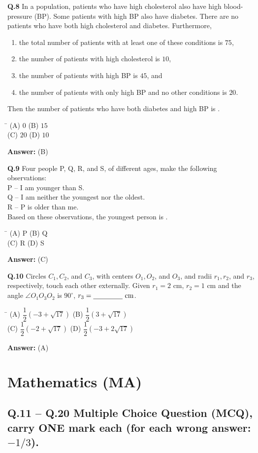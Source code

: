 \documentclass[11pt,a4paper]{article}
\newcommand{\optsfourA}[4]{%
  \begin{tabbing}
    \hspace{0.48\linewidth}\=\kill
    (A) #1 \> (B) #2 \\[2pt]
    (C) #3 \> (D) #4
  \end{tabbing}%
}
\newcommand{\ans}[1]{\textbf{Answer:} #1\par\medskip}
\begin{document}
\textbf{Q.8} In a population, patients who have high cholesterol also have high blood-pressure (BP). Some patients with high BP also have diabetes. There are no patients who have both high cholesterol and diabetes. Furthermore,
\begin{enumerate}
  \setlength{\itemsep}{1pt}\setlength{\parskip}{0pt}
  \item the total number of patients with at least one of these conditions is $75$,
  \item the number of patients with high cholesterol is $10$,
  \item the number of patients with high BP is $45$, and
  \item the number of patients with only high BP and no other conditions is $20$.
\end{enumerate}
Then the number of patients who have both diabetes and high BP is \underline{\hspace{2cm}}.
\optsfourA{$0$}{$15$}{$20$}{$10$}
\ans{(B)}

\textbf{Q.9} Four people P, Q, R, and S, of different ages, make the following observations:\\
P -- I am younger than S.\\
Q -- I am neither the youngest nor the oldest.\\
R -- P is older than me.\\
Based on these observations, the youngest person is \underline{\hspace{2cm}}.
\optsfourA{P}{Q}{R}{S}
\ans{(C)}

\textbf{Q.10} Circles $C_1, C_2$, and $C_3$, with centers $O_1, O_2$, and $O_3$, and radii $r_1, r_2$, and $r_3$, respectively, touch each other externally. Given $r_1 = 2\text{ cm}$, $r_2 = 1\text{ cm}$ and the angle $\angle O_1 O_3 O_2$ is $90^\circ$, $r_3 = \underline{\hspace{1.5cm}}\text{ cm}$.
\optsfourA{$\dfrac{1}{2}(-3 + \sqrt{17})$}{$\dfrac{1}{2}(3 + \sqrt{17})$}{$\dfrac{1}{2}(-2 + \sqrt{17})$}{$\dfrac{1}{2}(-3 + 2\sqrt{17})$}
\ans{(A)}

\section*{Mathematics (MA)}

\subsection*{Q.11 -- Q.20 Multiple Choice Question (MCQ), carry ONE mark each (for each wrong answer: $-1/3$).}
\end{document}
